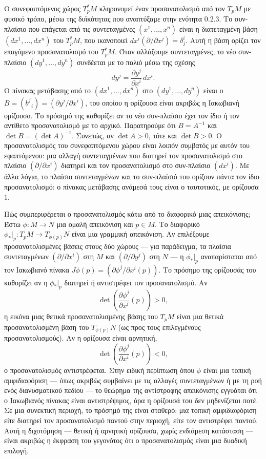 \documentclass[12pt]{article}
\begin{document}
Ο συνεφαπτόμενος χώρος $T_p^*M$ κληρονομεί έναν προσανατολισμό από τον $T_pM$ με φυσικό τρόπο, μέσω της δυϊκότητας που αναπτύξαμε στην ενότητα 0.2.3. Το συν-πλαίσιο που επάγεται από τις συντεταγμένες $(x^1, \dots, x^n)$ είναι η διατεταγμένη βάση $(dx^1, \dots, dx^n)$ του $T_p^*M$, που ικανοποιεί $dx^i(\partial / \partial x^j) = \delta^i_j$. Αυτή η βάση ορίζει τον επαγόμενο προσανατολισμό του $T_p^*M$. Όταν αλλάζουμε συντεταγμένες, το νέο συν-πλαίσιο $(dy^1, \dots, dy^n)$ συνδέεται με το παλιό μέσω της σχέσης
\[
dy^j = \frac{\partial y^j}{\partial x^i} \, dx^i.
\]
Ο πίνακας μετάβασης από το $(dx^1, \dots, dx^n)$ στο $(dy^1, \dots, dy^n)$ είναι ο $B = (b^j_{\;\; i}) = (\partial y^j / \partial x^i)$, του οποίου η ορίζουσα είναι ακριβώς η Ιακωβιανή ορίζουσα. Το πρόσημό της καθορίζει αν το νέο συν-πλαίσιο έχει τον ίδιο ή τον αντίθετο προσανατολισμό με το αρχικό. Παρατηρούμε ότι $B = A^{-1}$ και $\det B = (\det A)^{-1}$. Συνεπώς, αν $\det A > 0$, τότε και $\det B > 0$. Ο προσανατολισμός του συνεφαπτόμενου χώρου είναι λοιπόν συμβατός με αυτόν του εφαπτόμενου: μια αλλαγή συντεταγμένων που διατηρεί τον προσανατολισμό στο πλαίσιο $(\partial / \partial x^i)$ διατηρεί και τον προσανατολισμό στο συν-πλαίσιο $(dx^i)$. Με άλλα λόγια, το πλαίσιο συντεταγμένων και το συν-πλαίσιό του ορίζουν πάντα τον ίδιο προσανατολισμό: ο πίνακας μετάβασης ανάμεσά τους είναι ο ταυτοτικός, με ορίζουσα $1$.

Πώς συμπεριφέρεται ο προσανατολισμός κάτω από το διαφορικό μιας απεικόνισης; Έστω $\phi: M \to N$ μια ομαλή απεικόνιση και $p \in M$. Το διαφορικό $\phi_*|_p: T_pM \to T_{\phi(p)}N$ είναι μια γραμμική απεικόνιση. Αν επιλέξουμε προσανατολισμένες βάσεις στους δύο χώρους --- για παράδειγμα, τα πλαίσια συντεταγμένων $(\partial / \partial x^i)$ στη $M$ και $(\partial / \partial y^j)$ στη $N$ --- η $\phi_*|_p$ αναπαρίσταται από τον Ιακωβιανό πίνακα $J\phi(p) = (\partial \phi^j / \partial x^i(p))$. Το πρόσημο της ορίζουσάς του καθορίζει αν η $\phi_*|_p$ διατηρεί ή αντιστρέφει τον προσανατολισμό. Αν
\[
\det \left( \frac{\partial \phi^j}{\partial x^i}(p) \right) > 0,
\]
η εικόνα μιας θετικά προσανατολισμένης βάσης του $T_pM$ είναι μια θετικά προσανατολισμένη βάση του $T_{\phi(p)}N$ (ως προς τους επιλεγμένους προσανατολισμούς). Αν η ορίζουσα είναι αρνητική,
\[
\det \left( \frac{\partial \phi^j}{\partial x^i}(p) \right) < 0,
\]
ο προσανατολισμός αντιστρέφεται. Στην ειδική περίπτωση όπου $\phi$ είναι μια τοπική αμφιδιαφόριση --- όπως ακριβώς συμβαίνει με τις αλλαγές συντεταγμένων ή με τη ροή ενός διανυσματικού πεδίου --- το θεώρημα της αντίστροφης απεικόνισης εγγυάται ότι ο Ιακωβιανός πίνακας είναι αντιστρέψιμος, άρα η ορίζουσά του δεν μηδενίζεται ποτέ. Σε μια συνεκτική περιοχή, το πρόσημό της είναι σταθερό: μια τοπική αμφιδιαφόριση είτε διατηρεί τον προσανατολισμό παντού στην περιοχή, είτε τον αντιστρέφει παντού. Αυτή η διχοτόμηση --- θετική ή αρνητική ορίζουσα, χωρίς ενδιάμεση κατάσταση --- είναι ακριβώς η έκφραση του γεγονότος ότι ο προσανατολισμός είναι μια δυαδική επιλογή.
\end{document}
